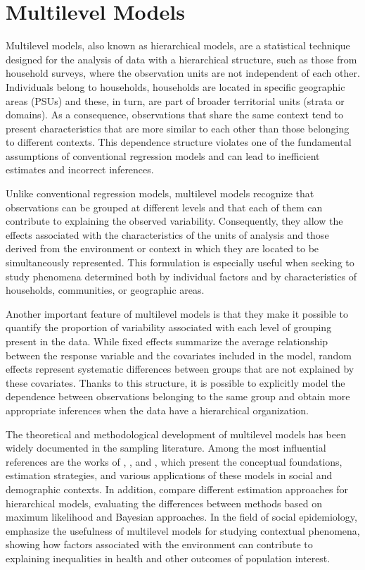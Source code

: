 \documentclass[
  english,
  12pt,
]{book}
\begin{document}
\chapter{Multilevel Models}\label{cap7}

Multilevel models, also known as hierarchical models, are a statistical technique designed for the analysis of data with a hierarchical structure, such as those from household surveys, where the observation units are not independent of each other. Individuals belong to households, households are located in specific geographic areas (PSUs) and these, in turn, are part of broader territorial units (strata or domains). As a consequence, observations that share the same context tend to present characteristics that are more similar to each other than those belonging to different contexts. This dependence structure violates one of the fundamental assumptions of conventional regression models and can lead to inefficient estimates and incorrect inferences.

Unlike conventional regression models, multilevel models recognize that observations can be grouped at different levels and that each of them can contribute to explaining the observed variability. Consequently, they allow the effects associated with the characteristics of the units of analysis and those derived from the environment or context in which they are located to be simultaneously represented. This formulation is especially useful when seeking to study phenomena determined both by individual factors and by characteristics of households, communities, or geographic areas.

Another important feature of multilevel models is that they make it possible to quantify the proportion of variability associated with each level of grouping present in the data. While fixed effects summarize the average relationship between the response variable and the covariates included in the model, random effects represent systematic differences between groups that are not explained by these covariates. Thanks to this structure, it is possible to explicitly model the dependence between observations belonging to the same group and obtain more appropriate inferences when the data have a hierarchical organization.

The theoretical and methodological development of multilevel models has been widely documented in the sampling literature. Among the most influential references are the works of \citet{goldstein2011multilevel}, \citet{gelman2006data}, and \citet{rabehesketh2012multilevel}, which present the conceptual foundations, estimation strategies, and various applications of these models in social and demographic contexts. In addition, \citet{browne2006comparison} compare different estimation approaches for hierarchical models, evaluating the differences between methods based on maximum likelihood and Bayesian approaches. In the field of social epidemiology, \citet{merlo2006brief} emphasize the usefulness of multilevel models for studying contextual phenomena, showing how factors associated with the environment can contribute to explaining inequalities in health and other outcomes of population interest.
\end{document}
